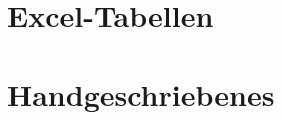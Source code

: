 \begin{appendices}
    \section{Excel-Tabellen}
    
    
    

    \section{Handgeschriebenes}
\end{appendices}
